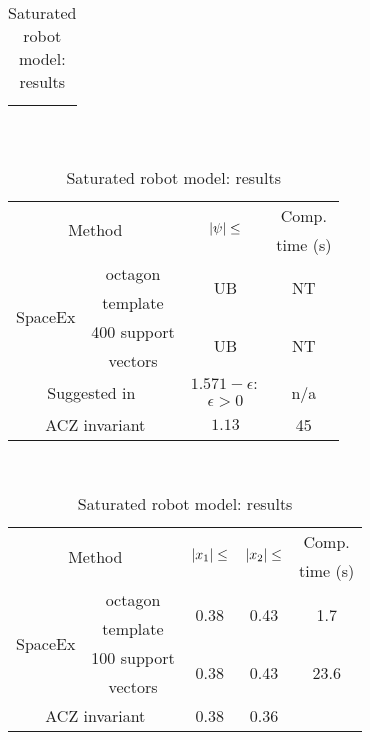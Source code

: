 \begin{table}
\begin{minipage}{0.48\textwidth}
\begin{tabular}{|l|c|c|c|}
\multicolumn{2}{|c|}{} & & \\
\hline
\end{tabular}
\caption{Unsaturated robot model: results}
~\label{tab:robot-unsaturated}
\end{minipage}
\hspace{0em}
\begin{minipage}{0.48\textwidth}
\centering
\begin{tabular}{|l|c|c|c|}
\hline
\multicolumn{2}{|c|}{\multirow{2}{*}{Method}} &
\multirow{2}{*}{$\left|\psi\right|\leq$} & Comp.\\
\multicolumn{2}{|c|}{} & & time (s)\\
\hline
\multirow{4}{*}{SpaceEx} & octagon & \multirow{2}{*}{UB} &
\multirow{2}{*}{NT}\\
& template & & \\
\cline{2-4}
& 400 support & \multirow{2}{*}{UB} & \multirow{2}{*}{NT}\\
& vectors & & \\
\hline
\multicolumn{2}{|c|}{\multirow{2}{*}{Suggested in~\cite{heinz2014benchmark}}} &
$1.571-\epsilon:$ & \multirow{2}{*}{n/a}\\
\multicolumn{2}{|c|}{} & $\epsilon>0$ &\\
\hline
\multicolumn{2}{|c|}{\multirow{2}{*}{ACZ invariant}} & \multirow{2}{*}{$1.13$} &
\multirow{2}{*}{45}\\
\multicolumn{2}{|c|}{} & &\\
\hline
\end{tabular}
\caption{Saturated robot model: results}
~\label{tab:robot-saturated}
\end{minipage}
\begin{minipage}{0.45\textwidth}
\begin{tabular}{|l|c|c|c|c|}
\hline
\multicolumn{2}{|c|}{\multirow{2}{*}{Method}} &
\multirow{2}{*}{$\left|x_1\right|\leq$} & \multirow{2}{*}{$\left|x_2\right|\leq$} & Comp.\\
\multicolumn{2}{|c|}{} & & & time (s) \\
\hline
\multirow{4}{*}{SpaceEx} & octagon & \multirow{2}{*}{0.38} &
\multirow{2}{*}{0.43} & \multirow{2}{*}{1.7}\\
& template & & &\\
\cline{2-5}
& 100 support & \multirow{2}{*}{0.38} & \multirow{2}{*}{0.43} & \multirow{2}{*}{23.6}\\
& vectors & & &\\
\hline
\multicolumn{2}{|c|}{\multirow{2}{*}{ACZ invariant}} &
\multirow{2}{*}{0.38} & \multirow{2}{*}{0.36} & 

\end{tabular}
\end{minipage}
\end{table}
